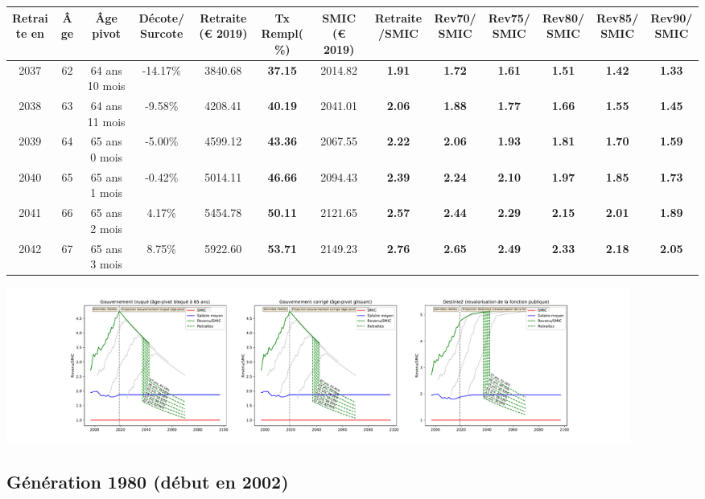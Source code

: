 { \scriptsize \begin{center} 
\begin{tabular}[htb]{|c|c||c|c||c|c||c||c|c|c|c|c|c|} 
\hline 
 Retraite en &  Âge &  Âge pivot &  Décote/Surcote &  Retraite (\euro{} 2019) &  Tx Rempl(\%) &  SMIC (\euro{} 2019) &  Retraite/SMIC &  Rev70/SMIC &  Rev75/SMIC &  Rev80/SMIC &  Rev85/SMIC &  Rev90/SMIC \\ 
\hline \hline 
 2037 &  62 &  64 ans 10 mois &  -14.17\% &  3840.68 &  {\bf 37.15} &  2014.82 &  {\bf 1.91} &  {\bf 1.72} &  {\bf 1.61} &  {\bf 1.51} &  {\bf 1.42} &  {\bf 1.33} \\ 
\hline 
 2038 &  63 &  64 ans 11 mois &  -9.58\% &  4208.41 &  {\bf 40.19} &  2041.01 &  {\bf 2.06} &  {\bf 1.88} &  {\bf 1.77} &  {\bf 1.66} &  {\bf 1.55} &  {\bf 1.45} \\ 
\hline 
 2039 &  64 &  65 ans 0 mois &  -5.00\% &  4599.12 &  {\bf 43.36} &  2067.55 &  {\bf 2.22} &  {\bf 2.06} &  {\bf 1.93} &  {\bf 1.81} &  {\bf 1.70} &  {\bf 1.59} \\ 
\hline 
 2040 &  65 &  65 ans 1 mois &  -0.42\% &  5014.11 &  {\bf 46.66} &  2094.43 &  {\bf 2.39} &  {\bf 2.24} &  {\bf 2.10} &  {\bf 1.97} &  {\bf 1.85} &  {\bf 1.73} \\ 
\hline 
 2041 &  66 &  65 ans 2 mois &  4.17\% &  5454.78 &  {\bf 50.11} &  2121.65 &  {\bf 2.57} &  {\bf 2.44} &  {\bf 2.29} &  {\bf 2.15} &  {\bf 2.01} &  {\bf 1.89} \\ 
\hline 
 2042 &  67 &  65 ans 3 mois &  8.75\% &  5922.60 &  {\bf 53.71} &  2149.23 &  {\bf 2.76} &  {\bf 2.65} &  {\bf 2.49} &  {\bf 2.33} &  {\bf 2.18} &  {\bf 2.05} \\ 
\hline 
\hline 
\end{tabular} 
\end{center} } 

 \begin{center}\includegraphics[width=0.9\textwidth]{fig/Magistrat_1975_22_dest_retraite.pdf}\end{center} \label{fig/Magistrat_1975_22_dest_retraite.pdf} 

\newpage 
 
\subsection{Génération 1980 (début en 2002)} 

